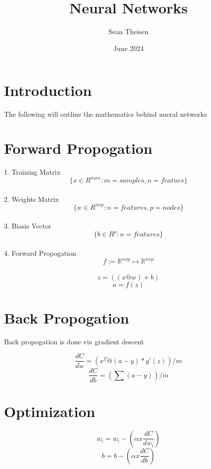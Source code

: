 \documentclass{article}
\title{Neural Networks}
\author{Sean Theisen}
\date{June 2024}
\begin{document}
\maketitle

\section{Introduction}
The following will outline the mathematics behind nueral networks

\section{Forward Propogation}
1. Training Matrix
	\[\{x \in R^{m x n} : m = samples, n = featues\}\]\\
2. Weights Matrix
	\[\{w \in R^{n x p} : n = features, p = nodes\}\]\\
3. Biasis Vector 
	\[\{b \in R^{p} : n = features\}\]\\
4. Forward Propogation
	\[f := \mathbb{R}^{nxp} \mapsto \mathbb{R}^{nxp}\]\\
\begin{equation}
	z = ((x@w)+b)
\end{equation}
\begin{equation}
	a = f(z)
\end{equation}

\section{Back Propogation}

Back propogation is done via gradient descent


\begin{equation}
	\frac{dC}{dw} = (x^{T} @ (a-y)*g'(z))/m
\end{equation}
\begin{equation}
	\frac{dC}{db} = (\sum (a-y))/ m
\end{equation}

\section{Optimization}
\begin{equation}
	w_{i} = w_{i} - (\alpha x \frac{dC}{dw_{i}})
\end{equation}
\begin{equation}
	b = b - (\alpha x \frac{dC}{db})
\end{equation}
\end{document}
